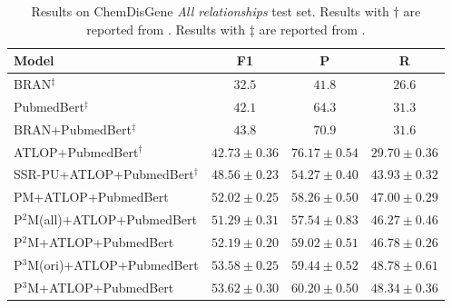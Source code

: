 \documentclass[11pt]{article}
\begin{document}
\begin{table}%
\centering
\small
\begin{tabular}{lccc}
\toprule \textbf{Model} & F1 & P & R \\
\midrule BRAN$^{\ddagger}$ & $32.5$ & $41.8$ & $26.6$ \\
PubmedBert$^{\ddagger}$ & $42.1$ & $64.3$ & $31.3$ \\
BRAN+PubmedBert$^{\ddagger}$ & $43.8$ & $70.9$ & $31.6$ \\
\midrule
ATLOP+PubmedBert$^{\dagger}$ & $42.73 \pm 0.36$ & $\mathbf{76.17} \pm \mathbf{0.54}$ & $29.70 \pm 0.36$ \\
SSR-PU+ATLOP+PubmedBert$^{\dagger}$ & $48.56 \pm 0.23$ & $54.27 \pm 0.40$ & $43.93 \pm 0.32$ \\
PM+ATLOP+PubmedBert & $52.02 \pm 0.25$ & $58.26 \pm 0.50$ & $47.00 \pm 0.29$ \\
P$^{2}$M(all)+ATLOP+PubmedBert & $51.29 \pm 0.31$ & $57.54 \pm 0.83$ & $46.27 \pm 0.46$ \\
P$^{2}$M+ATLOP+PubmedBert & $52.19 \pm 0.20$ & $59.02 \pm 0.51$ & $46.78 \pm 0.26$ \\
P$^{3}$M(ori)+ATLOP+PubmedBert & $53.58 \pm 0.25$ & $59.44 \pm 0.52$ & $\mathbf{48.78} \pm \mathbf{0.61}$ \\
P$^{3}$M+ATLOP+PubmedBert & $\mathbf{53.62} \pm \mathbf{0.30}$ & $60.20 \pm 0.50$ & $48.34 \pm 0.36$ \\
\bottomrule
\end{tabular}
\caption{\label{tab8}
Results on ChemDisGene \emph{All relationships} test set. Results with $\dagger$ are reported from \citep{wang2022unified}. Results with $\ddagger$ are reported from \citep{zhang-etal-2022-distant}.
}
\end{table}
\end{document}
